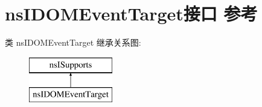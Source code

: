 \hypertarget{interfacens_i_d_o_m_event_target}{}\section{ns\+I\+D\+O\+M\+Event\+Target接口 参考}
\label{interfacens_i_d_o_m_event_target}
类 ns\+I\+D\+O\+M\+Event\+Target 继承关系图\+:\begin{figure}[H]
\begin{center}
\leavevmode
\includegraphics[height=2.000000cm]{interfacens_i_d_o_m_event_target}
\end{center}
\end{figure}

